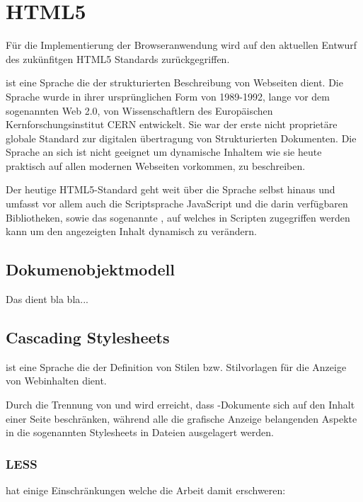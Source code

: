 \section{HTML5}

Für die Implementierung der Browseranwendung wird auf den aktuellen Entwurf des  zukünfitgen HTML5
Standards zurückgegriffen.

 ist eine Sprache die der strukturierten  Beschreibung von Webseiten dient. Die Sprache
wurde in ihrer ursprünglichen Form  von 1989-1992, lange vor dem sogenannten Web 2.0, von
Wissenschaftlern des  Europäischen Kernforschungsinstitut CERN entwickelt. Sie war der erste nicht
proprietäre globale Standard zur digitalen übertragung von Strukturierten  Dokumenten. Die Sprache
 an sich ist nicht geeignet um dynamische Inhaltem  wie sie heute praktisch auf allen
modernen Webseiten vorkommen, zu beschreiben.

Der heutige HTML5-Standard geht weit über die Sprache  selbst hinaus und  umfasst vor
allem auch die Scriptsprache JavaScript und die darin verfügbaren  Bibliotheken, sowie das
sogenannte , auf welches in  Scripten zugegriffen werden kann um den angezeigten Inhalt
dynamisch zu  verändern.

\subsection{Dokumenobjektmodell}

Das  dient bla bla...

\subsection{Cascading Stylesheets}

 ist eine Sprache die der Definition von  Stilen bzw.
Stilvorlagen für die Anzeige von Webinhalten dient.

Durch die Trennung von  und  wird erreicht, dass -Dokumente sich auf  den
Inhalt einer Seite beschränken, während alle die grafische Anzeige  belangenden Aspekte in die
sogenannten Stylesheets in  Dateien ausgelagert  werden.

\subsubsection{LESS}

 hat einige Einschränkungen welche die Arbeit damit erschweren:


